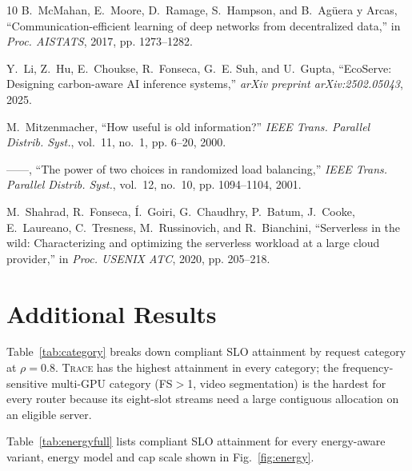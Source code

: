 \documentclass[journal]{IEEEtran}
\newcommand{\sys}{\textsc{Trace}}
\begin{document}
\begin{thebibliography}{10}
B.~McMahan, E.~Moore, D.~Ramage, S.~Hampson, and B.~{Ag{\"u}era y Arcas},
  ``Communication-efficient learning of deep networks from decentralized
  data,'' in \emph{Proc. AISTATS}, 2017, pp. 1273--1282.

Y.~Li, Z.~Hu, E.~Choukse, R.~Fonseca, G.~E. Suh, and U.~Gupta, ``{EcoServe}:
  Designing carbon-aware {AI} inference systems,'' \emph{arXiv preprint
  arXiv:2502.05043}, 2025.

M.~Mitzenmacher, ``How useful is old information?'' \emph{IEEE Trans. Parallel
  Distrib. Syst.}, vol.~11, no.~1, pp. 6--20, 2000.

------, ``The power of two choices in randomized load balancing,'' \emph{IEEE
  Trans. Parallel Distrib. Syst.}, vol.~12, no.~10, pp. 1094--1104, 2001.

M.~Shahrad, R.~Fonseca, {\'I}.~Goiri, G.~Chaudhry, P.~Batum, J.~Cooke,
  E.~Laureano, C.~Tresness, M.~Russinovich, and R.~Bianchini, ``Serverless in
  the wild: Characterizing and optimizing the serverless workload at a large
  cloud provider,'' in \emph{Proc. USENIX ATC}, 2020, pp. 205--218.

\end{thebibliography}

\appendices
\section{Additional Results}\label{app:results}

Table~\ref{tab:category} breaks down compliant SLO attainment by request category at $\rho=0.8$. \sys{} has the highest attainment in every category; the frequency-sensitive multi-GPU category (FS$>$1, video segmentation) is the hardest for every router because its eight-slot streams need a large contiguous allocation on an eligible server.

\begin{table}[h]
\centering
\caption{Compliant SLO attainment per request category at $\rho=0.8$ (10 seeds).}\label{tab:category}
\resizebox{\columnwidth}{!}{%
}
\end{table}

Table~\ref{tab:energyfull} lists compliant SLO attainment for every energy-aware variant, energy model and cap scale shown in Fig.~\ref{fig:energy}.
\end{document}
